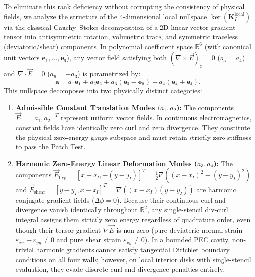 \documentclass[preprint,12pt]{elsarticle}
\begin{document}
To eliminate this rank deficiency without corrupting the consistency of physical fields, we analyze the structure of the 4-dimensional local nullspace $\ker(\mathbf{K}_I^{\mathrm{local}})$ via the classical Cauchy--Stokes decomposition of a 2D linear vector gradient tensor into antisymmetric rotation, volumetric trace, and symmetric traceless (deviatoric/shear) components. In polynomial coefficient space $\mathbb{R}^6$ (with canonical unit vectors $\mathbf{e}_1, \dots, \mathbf{e}_6$), any vector field satisfying both $(\nabla \times \vec{E})_z = 0$ ($a_5 = a_4$) and $\nabla \cdot \vec{E} = 0$ ($a_6 = -a_3$) is parametrized by:
\begin{equation}
    \mathbf{a} = a_1 \mathbf{e}_1 + a_2 \mathbf{e}_2 + a_3 (\mathbf{e}_3 - \mathbf{e}_6) + a_4 (\mathbf{e}_4 + \mathbf{e}_5).
\end{equation}
This nullspace decomposes into two physically distinct categories:
\begin{enumerate}
    \item \textbf{Admissible Constant Translation Modes ($a_1, a_2$):} The components $\vec{E} = [a_1, a_2]^T$ represent uniform vector fields. In continuous electromagnetics, constant fields have identically zero curl and zero divergence. They constitute the physical zero-energy gauge subspace and must retain strictly zero stiffness to pass the Patch Test.
    \item \textbf{Harmonic Zero-Energy Linear Deformation Modes ($a_3, a_4$):} The components $\vec{E}_{\mathrm{hyp}} = [x - x_I, -(y - y_I)]^T = \frac{1}{2}\nabla((x-x_I)^2 - (y-y_I)^2)$ and $\vec{E}_{\mathrm{shear}} = [y - y_I, x - x_I]^T = \nabla((x-x_I)(y-y_I))$ are harmonic conjugate gradient fields ($\Delta\phi = 0$). Because their continuous curl and divergence vanish identically throughout $\mathbb{R}^2$, any single-stencil div-curl integral assigns them strictly zero energy regardless of quadrature order, even though their tensor gradient $\nabla\vec{E}$ is non-zero (pure deviatoric normal strain $\varepsilon_{xx} - \varepsilon_{yy} \ne 0$ and pure shear strain $\varepsilon_{xy} \ne 0$). In a bounded PEC cavity, non-trivial harmonic gradients cannot satisfy tangential Dirichlet boundary conditions on all four walls; however, on local interior disks with single-stencil evaluation, they evade discrete curl and divergence penalties entirely.
\end{enumerate}
\end{document}
